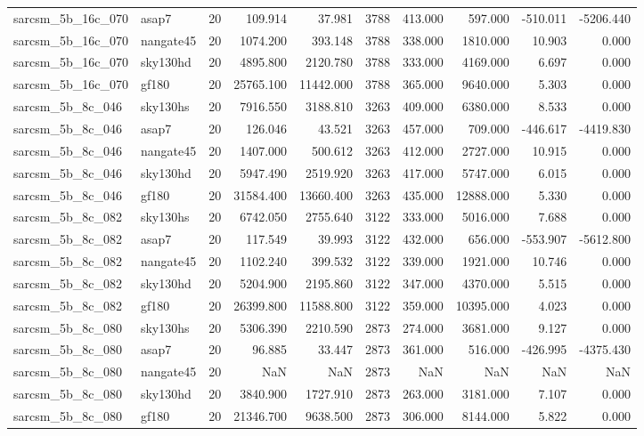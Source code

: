 \begin{tabular}{llrrrrrrrr}
sarcsm\_5b\_16c\_070 & asap7 & 20 & 109.914 & 37.981 & 3788 & 413.000 & 597.000 & -510.011 & -5206.440 \\
sarcsm\_5b\_16c\_070 & nangate45 & 20 & 1074.200 & 393.148 & 3788 & 338.000 & 1810.000 & 10.903 & 0.000 \\
sarcsm\_5b\_16c\_070 & sky130hd & 20 & 4895.800 & 2120.780 & 3788 & 333.000 & 4169.000 & 6.697 & 0.000 \\
sarcsm\_5b\_16c\_070 & gf180 & 20 & 25765.100 & 11442.000 & 3788 & 365.000 & 9640.000 & 5.303 & 0.000 \\
sarcsm\_5b\_8c\_046 & sky130hs & 20 & 7916.550 & 3188.810 & 3263 & 409.000 & 6380.000 & 8.533 & 0.000 \\
sarcsm\_5b\_8c\_046 & asap7 & 20 & 126.046 & 43.521 & 3263 & 457.000 & 709.000 & -446.617 & -4419.830 \\
sarcsm\_5b\_8c\_046 & nangate45 & 20 & 1407.000 & 500.612 & 3263 & 412.000 & 2727.000 & 10.915 & 0.000 \\
sarcsm\_5b\_8c\_046 & sky130hd & 20 & 5947.490 & 2519.920 & 3263 & 417.000 & 5747.000 & 6.015 & 0.000 \\
sarcsm\_5b\_8c\_046 & gf180 & 20 & 31584.400 & 13660.400 & 3263 & 435.000 & 12888.000 & 5.330 & 0.000 \\
sarcsm\_5b\_8c\_082 & sky130hs & 20 & 6742.050 & 2755.640 & 3122 & 333.000 & 5016.000 & 7.688 & 0.000 \\
sarcsm\_5b\_8c\_082 & asap7 & 20 & 117.549 & 39.993 & 3122 & 432.000 & 656.000 & -553.907 & -5612.800 \\
sarcsm\_5b\_8c\_082 & nangate45 & 20 & 1102.240 & 399.532 & 3122 & 339.000 & 1921.000 & 10.746 & 0.000 \\
sarcsm\_5b\_8c\_082 & sky130hd & 20 & 5204.900 & 2195.860 & 3122 & 347.000 & 4370.000 & 5.515 & 0.000 \\
sarcsm\_5b\_8c\_082 & gf180 & 20 & 26399.800 & 11588.800 & 3122 & 359.000 & 10395.000 & 4.023 & 0.000 \\
sarcsm\_5b\_8c\_080 & sky130hs & 20 & 5306.390 & 2210.590 & 2873 & 274.000 & 3681.000 & 9.127 & 0.000 \\
sarcsm\_5b\_8c\_080 & asap7 & 20 & 96.885 & 33.447 & 2873 & 361.000 & 516.000 & -426.995 & -4375.430 \\
sarcsm\_5b\_8c\_080 & nangate45 & 20 & NaN & NaN & 2873 & NaN & NaN & NaN & NaN \\
sarcsm\_5b\_8c\_080 & sky130hd & 20 & 3840.900 & 1727.910 & 2873 & 263.000 & 3181.000 & 7.107 & 0.000 \\
sarcsm\_5b\_8c\_080 & gf180 & 20 & 21346.700 & 9638.500 & 2873 & 306.000 & 8144.000 & 5.822 & 0.000 \\

\end{tabular}

